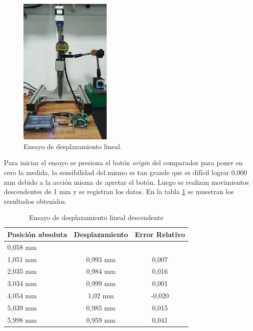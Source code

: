 \begin{figure}[h!]
\centering 
\includegraphics[width=0.4\textwidth]{./Figures/desplazamiento_lineal.png}
\caption{Ensayo de desplazamiento lineal.}
\label{fig:desplazamiento_lineal}
\end{figure}


Para iniciar el ensayo se presiona el botón \textit{origin} del comparador para poner en cero la medida, la sensibilidad del mismo es tan grande que es difícil lograr 0,000 mm debido a la acción misma  de apretar el botón. Luego se realizan movimientos descendentes de 1 mm y se registran los datos.
En la tabla \ref{tab:ensayo_desplazamiento_des} se muestran los resultados obtenidos.

\begin{table}[h!]
	\centering
	\caption[Ensayo de desplazamiento descendente]{Ensayo de desplazamiento lineal descendente}
	\begin{tabular}{l c c }    
		\toprule
		\textbf{Posición absoluta}     & \textbf{Desplazamiento} & \textbf{Error Relativo} \\
		\midrule
		0,058 mm	& 	        	& 	 			 	\\		
		1,051 mm    & 	0,993 mm    	& 	0,007				\\
		2,035 mm 	& 	0,984 mm	    & 	0,016 				\\
		3,034 mm	& 	0,999 mm	    & 	0,001 			\\
		4,054 mm 	& 	1,02 mm         & 	-0,020					\\
		5,039 mm 	& 	0,985 mm	    & 	0,015					\\
		5,998 mm 	& 	0,959 mm        & 	0,041 			\\
		\bottomrule
		\hline
	\end{tabular}
	\label{tab:ensayo_desplazamiento_des}
\end{table}

